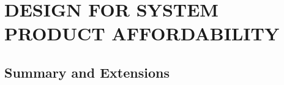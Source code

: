 \chapter{DESIGN FOR SYSTEM PRODUCT AFFORDABILITY}\label{chap:21}


\section{Summary and Extensions}

